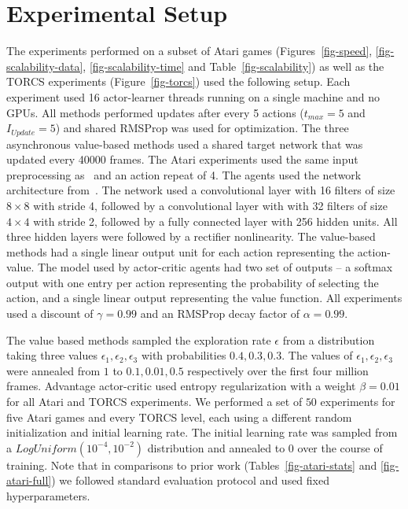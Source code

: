\section{Experimental Setup}
\label{sec:experimental-setup}
The experiments performed on a subset of Atari games (Figures~\ref{fig-speed}, \ref{fig-scalability-data}, \ref{fig-scalability-time} and Table~\ref{fig-scalability}) as well as the TORCS experiments (Figure~\ref{fig-torcs}) used the following setup.  Each experiment used 16 actor-learner threads running on a single machine and no GPUs.
All methods performed updates after every 5 actions ($t_{max}=5$ and $I_{Update}=5$) and shared RMSProp was used for optimization.
The three asynchronous value-based methods used a shared target network that was updated every 40000 frames.
The Atari experiments used the same input preprocessing as~\cite{mnih-dqn-2015} and an action repeat of 4.
The agents used the network architecture from~\cite{mnih-atari-2013}.
The network used a convolutional layer with 16 filters of size $8\times 8$ with stride 4, followed by a convolutional layer with with 32 filters of size $4\times 4$ with stride 2, followed by a fully connected layer with 256 hidden units.
All three hidden layers were followed by a rectifier nonlinearity.
The value-based methods had a single linear output unit for each action representing the action-value.
The model used by actor-critic agents had two set of outputs -- a softmax output with one entry per action representing the probability of selecting the action, and a single linear output representing the value function.
All experiments used a discount of $\gamma=0.99$ and an RMSProp decay factor of $\alpha=0.99$.

The value based methods sampled the exploration rate $\epsilon$ from a distribution taking three values $\epsilon_1, \epsilon_2, \epsilon_3$ with probabilities $0.4, 0.3, 0.3$.
The values of $\epsilon_1, \epsilon_2, \epsilon_3$ were annealed from $1$ to $0.1, 0.01, 0.5$ respectively over the first four million frames.
Advantage actor-critic used entropy regularization with a weight $\beta=0.01$ for all Atari and TORCS experiments.
We performed a set of $50$ experiments for five Atari games and every TORCS level, each using a different random initialization and initial learning rate.
The initial learning rate was sampled from a $LogUniform(10^{-4}, 10^{-2})$ distribution and annealed to $0$ over the course of training.
%
Note that in comparisons to prior work (Tables~\ref{fig-atari-stats} and \ref{fig-atari-full}) we followed standard evaluation protocol and used fixed hyperparameters.
